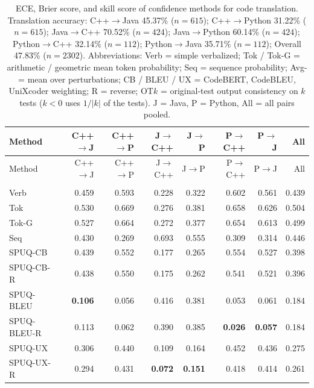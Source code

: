{\scriptsize
\setlength{\tabcolsep}{2.5pt}
\renewcommand{\arraystretch}{0.95}
\begin{longtable}{@{}lrrrrrrr@{}}
\caption{ECE, Brier score, and skill score of confidence methods for code translation. Translation accuracy: C++$\rightarrow$Java 45.37\% ($n=615$); C++$\rightarrow$Python 31.22\% ($n=615$); Java$\rightarrow$C++ 70.52\% ($n=424$); Java$\rightarrow$Python 60.14\% ($n=424$); Python$\rightarrow$C++ 32.14\% ($n=112$); Python$\rightarrow$Java 35.71\% ($n=112$); Overall 47.83\% ($n=2302$). Abbreviations: Verb = simple verbalized; Tok / Tok-G = arithmetic / geometric mean token probability; Seq = sequence probability; Avg- = mean over perturbations; CB / BLEU / UX = CodeBERT, CodeBLEU, UniXcoder weighting; R = reverse; OT$k$ = original-test output consistency on $k$ tests ($k<0$ uses $1/|k|$ of the tests). J = Java, P = Python, All = all pairs pooled.\label{tab:translation-calibration}}\\
\toprule
Method & C++$\to$J & C++$\to$P & J$\to$C++ & J$\to$P & P$\to$C++ & P$\to$J & All \\
\midrule
\endfirsthead
\toprule
Method & C++$\to$J & C++$\to$P & J$\to$C++ & J$\to$P & P$\to$C++ & P$\to$J & All \\
\midrule
\endhead
\bottomrule
\endfoot
\multicolumn{8}{l}{\textit{ECE (10 bins, lower is better)}} \\
\midrule
Verb & 0.459 & 0.593 & 0.228 & 0.322 & 0.602 & 0.561 & 0.439 \\
\addlinespace
Tok & 0.530 & 0.669 & 0.276 & 0.381 & 0.658 & 0.626 & 0.504 \\
Tok-G & 0.527 & 0.664 & 0.272 & 0.377 & 0.654 & 0.613 & 0.499 \\
\addlinespace
Seq & 0.430 & 0.269 & 0.693 & 0.555 & 0.309 & 0.314 & 0.446 \\
\addlinespace
SPUQ-CB & 0.439 & 0.552 & 0.177 & 0.265 & 0.554 & 0.527 & 0.398 \\
SPUQ-CB-R & 0.438 & 0.550 & 0.175 & 0.262 & 0.541 & 0.521 & 0.396 \\
SPUQ-BLEU & \textbf{0.106} & 0.056 & 0.416 & 0.381 & 0.053 & 0.061 & 0.184 \\
SPUQ-BLEU-R & 0.113 & 0.062 & 0.390 & 0.385 & \textbf{0.026} & \textbf{0.057} & 0.184 \\
SPUQ-UX & 0.306 & 0.440 & 0.109 & 0.164 & 0.452 & 0.436 & 0.275 \\
SPUQ-UX-R & 0.294 & 0.431 & \textbf{0.072} & \textbf{0.151} & 0.418 & 0.414 & 0.261 \\

\end{longtable}}
